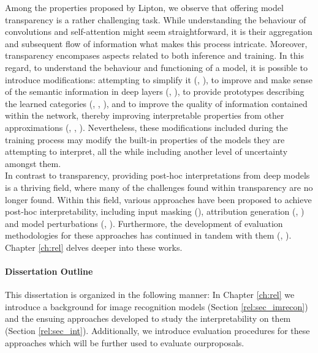 \noindent Among the properties proposed by Lipton, we observe that offering model transparency is a 
rather challenging task. While understanding the behaviour of convolutions and 
self-attention might seem straightforward, it is their aggregation and subsequent flow of 
information what makes this process intricate. Moreover, transparency encompases aspects related to 
both inference and training. In this regard, to understand the behaviour and functioning of a model, 
it is possible to introduce modifications: attempting  to simplify it (\cite{wu2018beyond}, 
\cite{wu2020regional}), to improve and make sense of the semantic information in deep layers 
(\cite{bau2017network}, \cite{zhou2018interpreting}), to provide prototypes describing the learned
categories (\cite{li2018deep}, \cite{chen2019looks}, \cite{rymarczyk2022interpretable}), and to 
improve the quality of information contained within the network, thereby improving interpretable 
properties from other approximations (\cite{ismail2021improving}, \cite{Zhou_2022_BMVC}, 
\cite{ross2017right}). Nevertheless, these modifications included during the training process may 
modify the built-in properties of the models they are attempting to interpret, all the while 
including another level of uncertainty amongst them.\\

In contrast to transparency, providing post-hoc interpretations from deep models is a 
thriving field, where many of the challenges found within transparency are no longer found.
Within this field, various approaches have been proposed to achieve post-hoc interpretability,
including input masking (\cite{petsiuk2018rise}), attribution generation (\cite{NIPS2017_7062}, 
\cite{zhou2016learning}) and model perturbations 
(\cite{fong2017interpretable}, \cite{fong2019understanding}). Furthermore, the development of 
evaluation methodologies for these approaches has continued in tandem with them 
(\cite{choe2020evaluating}, \cite{chattopadhay2018grad}). Chapter \ref{ch:rel} delves deeper into 
these works. 

\paragraph{Dissertation Outline}
\noindent This dissertation is organized in the following manner: In Chapter \ref{ch:rel} we 
introduce a background for image recognition models (Section \ref{rel:sec_imrecon}) and the ensuing 
approaches developed to study the interpretability on them (Section \ref{rel:sec_int}). 
Additionally, we introduce evaluation procedures for these approaches which will be further used to 
evaluate ourproposals.\\

